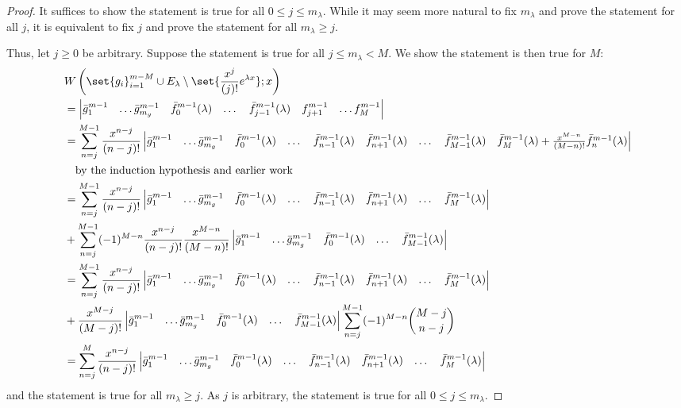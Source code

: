 \documentclass{book}
\begin{document}
\begin{proof}
It suffices to show the statement is true for all $0 \leq j \leq m_\lambda$.
While it may seem more natural to fix $m_\lambda$ and prove the statement for all $j$, it is equivalent to fix $j$ and prove the statement for all $m_\lambda \geq j$.

Thus, let $j \geq 0$ be arbitrary.
Suppose the statement is true for all $j \leq m_\lambda < M$.
We show the statement is then true for $M$:
\begin{equation*}
\begin{split}
& \W{ \set{g_i}_{i=1}^{m - M} \cup E_\lambda \setminus \set{\poly{j} e^{\lambda x}}}{x} \\
& = \begin{vmatrix} \bar{g}_1^{m-1} & \dots \bar{g}_{m_g}^{m-1} & \fmn{0}{m-1}(\lambda) & \dots & \fmn{j-1}{m-1}(\lambda) & f_{j+1}^{m-1} & \dots f_{M}^{m-1} \end{vmatrix} \\
& = \sum_{n=j}^{M-1} \poly{n-j} \begin{vmatrix} \bar{g}_1^{m-1} & \dots \bar{g}_{m_g}^{m-1} & \fmn{0}{m-1}(\lambda) & \dots & \fmn{n-1}{m-1}(\lambda) & \fmn{n+1}{m-1}(\lambda) & \dots & \fmn{M-1}{m-1}(\lambda) & \fmn{M}{m-1}(\lambda) + \poly{M-n} \fmn{n}{m-1}(\lambda) \end{vmatrix} \\ & \quad \text{by the induction hypothesis and earlier work} \\
& = \sum_{n=j}^{M-1} \poly{n-j} \begin{vmatrix} \bar{g}_1^{m-1} & \dots \bar{g}_{m_g}^{m-1} & \fmn{0}{m-1}(\lambda) & \dots & \fmn{n-1}{m-1}(\lambda) & \fmn{n+1}{m-1}(\lambda) & \dots & \fmn{M}{m-1}(\lambda) \end{vmatrix} \\
& + \sum_{n=j}^{M-1} (-1)^{M-n} \poly{n-j} \poly{M-n} \begin{vmatrix} \bar{g}_1^{m-1} & \dots \bar{g}_{m_g}^{m-1} & \fmn{0}{m-1}(\lambda) & \dots & \fmn{M-1}{m-1}(\lambda) \end{vmatrix} \\
& = \sum_{n=j}^{M-1} \poly{n-j} \begin{vmatrix} \bar{g}_1^{m-1} & \dots \bar{g}_{m_g}^{m-1} & \fmn{0}{m-1}(\lambda) & \dots & \fmn{n-1}{m-1}(\lambda) & \fmn{n+1}{m-1}(\lambda) & \dots & \fmn{M}{m-1}(\lambda) \end{vmatrix} \\
& + \poly{M-j} \begin{vmatrix} \bar{g}_1^{m-1} & \dots \bar{g}_{m_g}^{m-1} & \fmn{0}{m-1}(\lambda) & \dots & \fmn{M-1}{m-1}(\lambda) \end{vmatrix} \sum_{n=j}^{M-1} (-1)^{M-n} \binom{M-j}{n-j} \\
& = \sum_{n=j}^M \poly{n-j} \begin{vmatrix} \bar{g}_1^{m-1} & \dots \bar{g}_{m_g}^{m-1} & \fmn{0}{m-1}(\lambda) & \dots & \fmn{n-1}{m-1}(\lambda) & \fmn{n+1}{m-1}(\lambda) & \dots & \fmn{M}{m-1}(\lambda) \end{vmatrix}
\end{split}
\end{equation*}
and the statement is true for all $m_\lambda \geq j$.
As $j$ is arbitrary, the statement is true for all $0 \leq j \leq m_\lambda$.


\end{proof}
\end{document}
